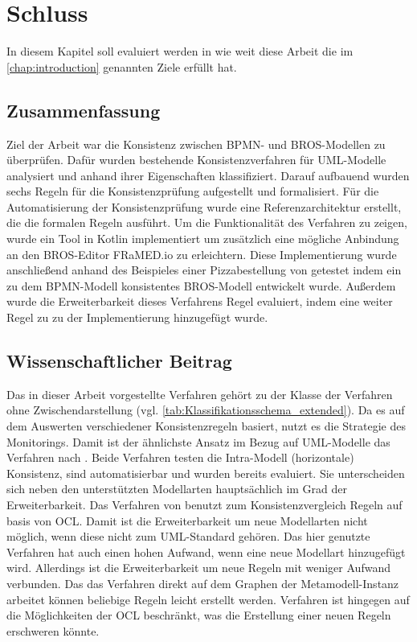 \chapter{Schluss}
\label{chap:conclusion}

In diesem Kapitel soll evaluiert werden in wie weit diese Arbeit die im \cref{chap:introduction} genannten Ziele erfüllt hat.

\section{Zusammenfassung}

Ziel der Arbeit war die Konsistenz zwischen BPMN- und BROS-Modellen zu überprüfen.
Dafür wurden bestehende Konsistenzverfahren für UML-Modelle analysiert und anhand ihrer Eigenschaften klassifiziert.
Darauf aufbauend wurden sechs Regeln für die Konsistenzprüfung aufgestellt und formalisiert.
Für die Automatisierung der Konsistenzprüfung wurde eine Referenzarchitektur erstellt, die die formalen Regeln ausführt.
Um die Funktionalität des Verfahren zu zeigen, wurde ein Tool in Kotlin implementiert um zusätzlich eine mögliche Anbindung an den BROS-Editor FRaMED.io zu erleichtern.
Diese Implementierung wurde anschließend anhand des Beispieles einer Pizzabestellung von \cite{Schoen} getestet indem ein zu dem BPMN-Modell konsistentes BROS-Modell entwickelt wurde.
Außerdem wurde die Erweiterbarkeit dieses Verfahrens Regel evaluiert, indem eine weiter Regel zu zu der Implementierung hinzugefügt wurde. 

\section{Wissenschaftlicher Beitrag}

Das in dieser Arbeit vorgestellte Verfahren gehört zu der Klasse der Verfahren ohne Zwischendarstellung (vgl. \cref{tab:Klassifikationsschema_extended}).
Da es auf dem Auswerten verschiedener Konsistenzregeln basiert, nutzt es die Strategie des Monitorings.
Damit ist der ähnlichste Ansatz im Bezug auf UML-Modelle das Verfahren nach \cite{Egyed2006}.
Beide Verfahren testen die Intra-Modell (horizontale) Konsistenz, sind automatisierbar und wurden bereits evaluiert.
Sie unterscheiden sich neben den unterstützten Modellarten hauptsächlich im Grad der Erweiterbarkeit.
Das Verfahren von \cite{Egyed2006} benutzt zum Konsistenzvergleich Regeln auf basis von OCL.
Damit ist die Erweiterbarkeit um neue Modellarten nicht möglich, wenn diese nicht zum UML-Standard gehören.
Das hier genutzte Verfahren hat auch einen hohen Aufwand, wenn eine neue Modellart hinzugefügt wird.
Allerdings ist die Erweiterbarkeit um neue Regeln mit weniger Aufwand verbunden.
Das das Verfahren direkt auf dem Graphen der Metamodell-Instanz arbeitet können beliebige Regeln leicht erstellt werden.
\cite{Egyed2006} Verfahren ist hingegen auf die Möglichkeiten der OCL beschränkt, was die Erstellung einer neuen Regeln erschweren könnte.

